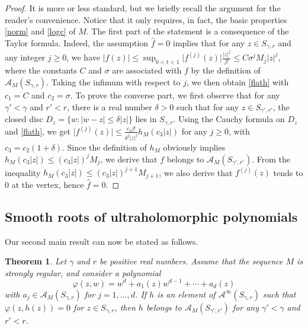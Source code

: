\documentclass[a4paper]{amsart}
\theoremstyle{plain}
\newtheorem{thm}{Theorem}
\theoremstyle{remark}
\begin{document}
\begin{proof} It is more or less standard, but we briefly recall the argument for the reader's convenience. Notice that it only requires, in fact, the basic properties \eqref{norm} and \eqref{logc} of $ M $. The first part of the statement is a consequence of the Taylor formula. Indeed, the assumption $ \widehat{f}=0 $ implies that for any $ z\in S_{\gamma,r} $ and any integer $ j\geq 0 $, we have
$ \vert f(z)\vert \leq \sup_{0<t<1}\vert f^{(j)}(z)\vert \frac{\vert z\vert^j}{j!}\leq C\sigma^j M_j\vert z\vert^j $, where the constants $ C $ and $ \sigma $ are associated with $ f $ by the definition of $ \mathcal{A}_M(S_{\gamma,r}) $. Taking the infimum with respect to $ j $, we then obtain \eqref{flath} with $ c_1=C $ and $ c_2=\sigma $.
To prove the converse part, we first observe that for any $ \gamma'<\gamma $ and $ r'<r $, there is a real number $ \delta>0 $ such that for any $ z\in S_{\gamma',r'} $, the closed disc $ D_z=\{w: \vert w-z\vert\leq \delta \vert z\vert\} $ lies in $ S_{\gamma,r} $. Using the Cauchy formula on $ D_z $ and \eqref{flath}, we get
$ \vert f^{(j)}(z)\vert\leq \frac{c_1 j!}{\delta^j\vert z\vert^j}h_M(c_3\vert z\vert) $ for any $ j\geq 0 $, with $ c_3=c_2(1+\delta) $. Since the definition of $ h_M $ obviously implies $ h_M(c_3\vert z\vert)\leq (c_3\vert z\vert)^j M_j $, we derive that $ f $ belongs to $ \mathcal{A}_M(S_{\gamma',r'}) $. From the inequality $ h_M(c_3\vert z\vert)\leq (c_3\vert z\vert)^{j+1} M_{j+1} $, we also derive that $ f^{(j)}(z) $ tends to $ 0 $ at the vertex, hence $ \widehat{f}=0 $. 
\end{proof}

\subsection{Smooth roots of ultraholomorphic polynomials}

Our second main result can now be stated as follows.

\begin{thm}\label{main2} Let $ \gamma $ and $ r $ be positive real numbers. Assume that the sequence $ M $ is strongly regular, and
consider a polynomial 
\begin{equation*}
\varphi(z,w)=w^d+a_1(z)w^{d-1}+\cdots+a_d(z)
\end{equation*}
with $ a_j\in\mathcal{A}_M(S_{\gamma,r}) $ for $ j=1,\ldots,d $. If $ h $ is  an element of $ \mathcal{A}^\infty(S_{\gamma,r}) $ such that $ \varphi(z,h(z))=0 $ for $ z\in S_{\gamma,r} $, then $ h $ belongs to $ \mathcal{A}_M(S_{\gamma',r'}) $ for any $ \gamma'<\gamma $ and $ r'<r $.
\end{thm}
\end{document}
